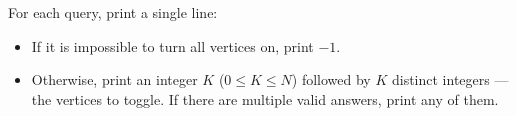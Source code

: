 For each query, print a single line:

\begin{itemize}
\item If it is impossible to turn all vertices on, print $-1$.
\item Otherwise, print an integer $K$ ($0 \le K \le N$) followed by $K$ distinct integers --- the vertices to toggle. If there are multiple valid answers, print any of them.
\end{itemize}
